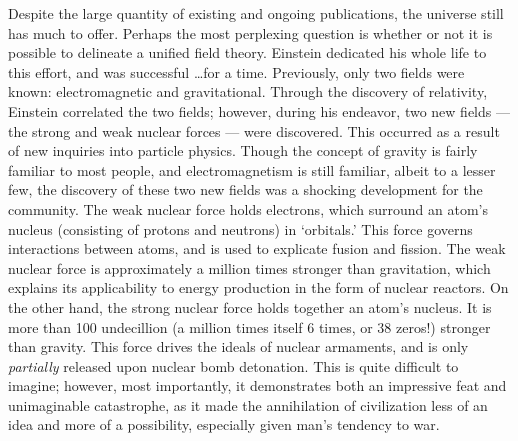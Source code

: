 \begin{justify}
  \hspace{.5in} Despite the large quantity of existing and ongoing publications, the universe still has much to offer. Perhaps the most perplexing question is whether or not it is possible to delineate a unified field theory. Einstein dedicated his whole life to this effort, and was successful \ldots for a time. Previously, only two fields were known: electromagnetic and gravitational. Through the discovery of relativity, Einstein correlated the two fields; however, during his endeavor, two new fields — the strong and weak nuclear forces — were discovered. This occurred as a result of new inquiries into particle physics. Though the concept of gravity is fairly familiar to most people, and electromagnetism is still familiar, albeit to a lesser few, the discovery of these two new fields was a shocking development for the community. The weak nuclear force holds electrons, which surround an atom's nucleus (consisting of protons and neutrons) in `orbitals.' This force governs interactions between atoms, and is used to explicate fusion and fission. The weak nuclear force is approximately a million times stronger than gravitation, which explains its applicability to energy production in the form of nuclear reactors. On the other hand, the strong nuclear force holds together an atom's nucleus. It is more than 100 undecillion (a million times itself 6 times, or 38 zeros!) stronger than gravity. This force drives the ideals of nuclear armaments, and is only \textit{partially} released upon nuclear bomb detonation. This is quite difficult to imagine; however, most importantly, it demonstrates both an impressive feat and unimaginable catastrophe, as it made the annihilation of civilization less of an idea and more of a possibility, especially given man's tendency to war.


\end{justify}
